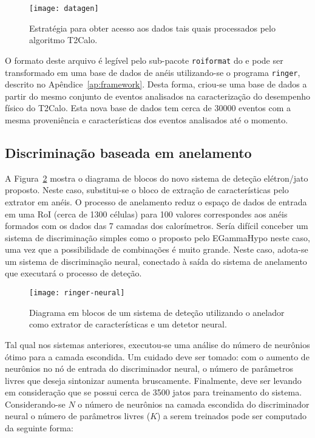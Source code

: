 \begin{figure}
\begin{center}
\texttt{[image: datagen]}
\end{center}
\caption{Estratégia para obter acesso aos dados tais quais processados pelo
algoritmo T2Calo.}
\label{fig:datagen}
\end{figure}

O formato deste arquivo é legível pelo sub-pacote \texttt{roiformat} do
 e pode ser transformado em uma base de dados de anéis
utilizando-se o programa \texttt{ringer}, descrito no
Apêndice~\ref{ap:framework}. Desta forma, criou-se uma base de dados a partir
do mesmo conjunto de eventos analisados na caracterização do desempenho físico
do T2Calo. Esta nova base de dados tem cerca de $30000$ eventos com a mesma
proveniência e características dos eventos analisados até o momento.

\subsection{Discriminação baseada em anelamento}

A Figura~\ref{fig:ringer-neural} mostra o diagrama de blocos do novo sistema
de deteção elétron/jato proposto. Neste caso, substitui-se o bloco de extração
de características pelo extrator em anéis. O processo de anelamento reduz o
espaço de dados de entrada em uma RoI (cerca de 1300 células) para 100 valores
correspondes aos anéis formados com os dados das 7 camadas dos
calorímetros. Sería difícil conceber um sistema de discriminação simples como
o proposto pelo EGammaHypo neste caso, uma vez que a possibilidade de
combinações é muito grande. Neste caso, adota-se um sistema de discriminação
neural, conectado à saída do sistema de anelamento que executará o processo de
deteção.

\begin{figure}
\begin{center}
\texttt{[image: ringer-neural]}
\end{center}
\caption{Diagrama em blocos de um sistema de deteção utilizando o anelador
como extrator de características e um detetor neural.}
\label{fig:ringer-neural}
\end{figure}

Tal qual nos sistemas anteriores, executou-se uma análise do número de
neurônios ótimo para a camada escondida. Um cuidado deve ser tomado: com o
aumento de neurônios no nó de entrada do discriminador neural, o número de
parâmetros livres que deseja sintonizar aumenta bruscamente. Finalmente, deve
ser levando em consideração que se possui cerca de 3500 jatos para treinamento
do sistema. Considerando-se $N$ o número de neurônios na camada escondida do
discriminador neural o número de parâmetros livres ($K$) a serem treinados
pode ser computado da seguinte forma:

